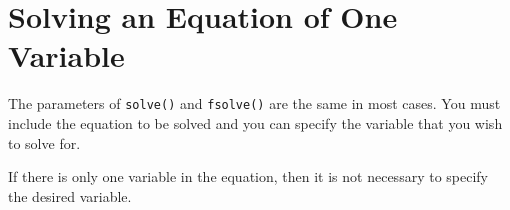 \section{Solving an Equation of One Variable}

The parameters of \texttt{solve()} and \texttt{fsolve()} are the same in most cases. You must include the equation to be solved and you can specify the variable that you wish to solve for.

\begin{maplegroup}
\begin{mapleinput}
\end{mapleinput}
\mapleresult
\begin{maplelatex}
\end{maplelatex}
\end{maplegroup}

\begin{maplegroup}
\begin{mapleinput}
\end{mapleinput}
\mapleresult
\begin{maplelatex}
\end{maplelatex}
\end{maplegroup}

If there is only one variable in the equation, then it is not necessary to specify the desired variable.

\begin{maplegroup}
\begin{mapleinput}
\end{mapleinput}
\mapleresult
\begin{maplelatex}
\end{maplelatex}
\end{maplegroup}
\begin{maplegroup}
\begin{mapleinput}
\end{mapleinput}
\mapleresult
\begin{maplelatex}
\end{maplelatex}
\end{maplegroup}

